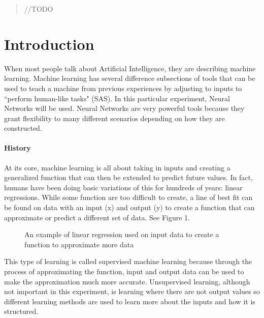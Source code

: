 \documentclass[12pt]{article}
\begin{document}
\maketitle

\begin{abstract}
\color{red} //TODO
\end{abstract}

\section{Introduction}
\quad When most people talk about Artificial Intelligence, they are describing machine learning. Machine learning has several difference subsections of tools that can be used to teach a machine from previous experiences by adjusting to inputs to ``perform human-like tasks" (SAS). In this particular experiment, Neural Networks will be used. Neural Networks are very powerful tools because they grant flexibility to many different scenarios depending on how they are constructed. 


\paragraph{History}
At its core, machine learning is all about taking in inputs and creating a generalized function that can then be extended to predict future values. In fact, humans have been doing basic variations of this for hundreds of years: linear regressions. While some function are too difficult to create, a line of best fit can be found on data with an input (x) and output (y) to create a function that can approximate or predict a different set of data. See Figure 1. 

\begin{figure}[H]
    \centering
    \def\svgwidth{\columnwidth}
    
    \caption{An example of linear regression used on input data to create a function to approximate more data}
\end{figure}

This type of learning is called supervised machine learning because through the process of approximating the function, input and output data can be used to make the approximation much more accurate. Unsupervised learning, although not important in this experiment, is learning where there are not output values so different learning methods are used to learn more about the inputs and how it is structured. \\%
\end{document}
